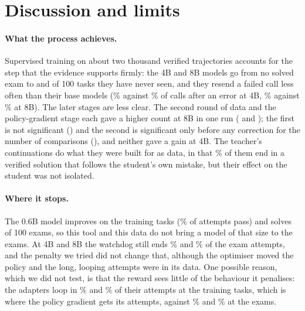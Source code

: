 \section{Discussion and limits}\label{sec:discussion}
\paragraph{What the process achieves.} Supervised training on about two thousand verified trajectories accounts for
the step that the evidence supports firmly: the 4B and 8B models go from no solved exam to \examFourFullFive{} and
\examEightFullFive{} of 100 tasks they have never seen, and they resend a failed call less often than their base
models (\behaviourFourFullExamRepeatPct{}\% against \behaviourFourBaseExamRepeatPct{}\% of calls after an error at 4B,
\behaviourEightFullExamRepeatPct{}\% against \behaviourEightBaseExamRepeatPct{}\% at 8B). The later stages are less clear. The second round of data and the policy-gradient stage each gave a higher
count at 8B in one run (\examEightRtwoFive{} and \examEightPgFive{}); the first is not significant (\ptestEightRtwo{}) and the
second is significant only before any correction for the number of comparisons (\ptestEightPg{}), and neither gave a gain at 4B. The teacher's continuations do what they were built
for as data, in that \recoverySolvedPct{}\% of them end in a verified solution that follows the student's own mistake,
but their effect on the student was not isolated.

\paragraph{Where it stops.} The 0.6B model improves on the training tasks (\trainZeroFullPct{}\% of attempts pass) and
solves \examZeroFullFive{} of 100 exams, so this tool and this data do not bring a model of that size to the exams.
At 4B and 8B the watchdog still ends \behaviourFourFullExamLoopPct{}\% and \behaviourEightFullExamLoopPct{}\% of the exam attempts, and the penalty we tried did not change that,
although the optimiser moved the policy and the long, looping attempts were in its data. One possible reason, which we
did not test, is that the reward sees little of the behaviour it penalises: the adapters loop in
\behaviourFourFullTrainLoopPct{}\% and \behaviourEightFullTrainLoopPct{}\% of their attempts at the training tasks,
which is where the policy gradient gets its attempts, against \behaviourFourFullExamLoopPct{}\% and
\behaviourEightFullExamLoopPct{}\% at the exams.

